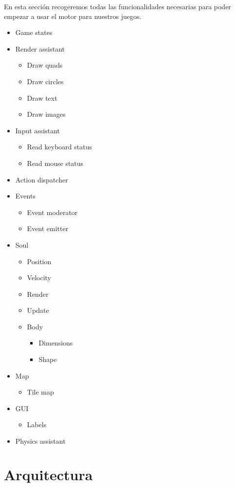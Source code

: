 \documentclass[a4paper]{article}
\begin{document}
En esta sección recogeremos todas las funcionalidades necesarias para poder empezar a usar el motor para nuestros juegos. 

\begin{itemize}
  \item Game states
  \item Render assistant
  \begin{itemize}
    \item Draw quads
    \item Draw circles
    \item Draw text
    \item Draw images
  \end{itemize}
  \item Input assistant
  \begin{itemize}
    \item Read keyboard status
    \item Read mouse status
  \end{itemize}
  \item Action dispatcher
  \item Events
  \begin{itemize}
    \item Event moderator
    \item Event emitter
  \end{itemize}
  \item Soul
  \begin{itemize}
    \item Position
    \item Velocity
    \item Render
    \item Update
    \item Body
    \begin{itemize}
      \item Dimensions
      \item Shape
    \end{itemize}
  \end{itemize}
  \item Map
  \begin{itemize}
    \item Tile map
  \end{itemize}
  \item GUI
  \begin{itemize}
    \item Labels
  \end{itemize}
  \item Physics assistant
\end{itemize}

\section{Arquitectura}
\end{document}
